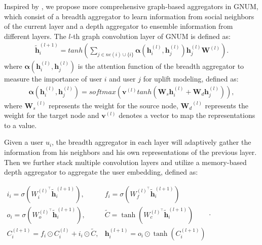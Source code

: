 Inspired by \cite{liu2019geniepath}, we propose more comprehensive graph-based aggregators in GNUM, which consist of a breadth aggregator to learn information from social neighbors of the current layer and a depth aggregator to ensemble information from different layers. The $l$-th graph convolution layer of GNUM is defined as:
\begin{equation} \label{eq_hdli}
	\begin{gathered}
		 \mathbf{\tilde{h}}^{(l+1)}_i = tanh \left(\sum_{j \in ne(i) \cup \{i\}} 
		\boldsymbol{\alpha}(\mathbf{h}_i^{(l)},\mathbf{h}_j^{(l)})
		 \mathbf{h}^{(l)}_j  \mathbf{W}^{(l)} \right).
	\end{gathered}
\end{equation}
where $\boldsymbol{\alpha}(\mathbf{h}_i^{(l)},\mathbf{h}_j^{(l)})$ is the attention function of the breadth aggregator to measure the importance of user $i$ and user $j$ for uplift modeling, defined as:
\begin{equation} \label{eq_att}
	\begin{gathered}
		\boldsymbol{\alpha}(\mathbf{h}_i^{(l)},\mathbf{h}_j^{(l)}) = softmax(\mathbf{v}^{(l)}tanh(\mathbf{W}_{s}\mathbf{h}_i^{(l)} + \mathbf{W}_{d}\mathbf{h}_j^{(l)})),
	\end{gathered}
\end{equation}
where  ${\mathbf{W}_s}^{(l)}$ represents the weight for the source node, ${\mathbf{W}_d}^{(l)}$ represents the weight for the target node and $\mathbf{v}^{(l)}$ denotes a vector to map the representations to a value.

Given a user $u_i$, the breadth aggregator in each layer will adaptively gather the information from his neighbors and his own representations of the previous layer. Then we further stack multiple convolution layers and utilize a memory-based depth aggregator to aggregate the user embedding, defined as:

$
\begin{array}{ll}
i_{i}=\sigma\left(W_{i}^{(l)^{\top}}  \mathbf{\tilde{h}}_i^{(l+1)}\right), & f_{i}=\sigma\left(W_{f}^{(l)^{\top}}  \mathbf{\tilde{h}}_i^{(l+1)}\right) \\
o_{i}=\sigma\left(W_{o}^{(l)^{\top}}  \mathbf{\tilde{h}}_i^{(l+1)}\right), & \tilde{C}=\tanh \left(W_{c}^{(l)^{\top}}  \mathbf{\tilde{h}}_i^{(l+1)}\right) \\
C_{i}^{(l+1)}=f_{i} \odot C_{i}^{(l)}+i_{i} \odot \tilde{C}, & \mathbf{h}_{i}^{(l+1)}=o_{i} \odot \tanh \left(C_{i}^{(l+1)}\right)
\end{array}.
$

